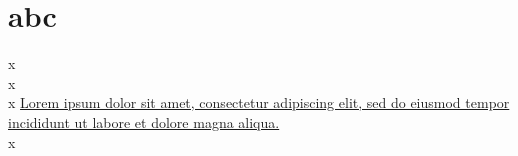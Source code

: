 \documentclass{article}
\begin{document}
\section{abc}
x\\x\\x
\href{https://www.latex-project.org}{Lorem ipsum dolor sit amet, consectetur adipiscing elit, sed do eiusmod tempor incididunt ut labore et dolore magna aliqua.}\\x

\kant[1-2]
\end{document}
